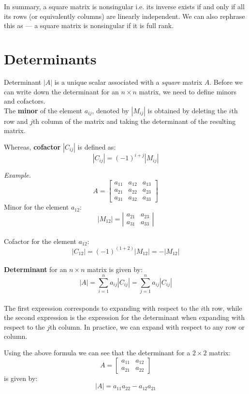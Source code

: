 \documentclass{./../Latex/handout}
\begin{document}
In summary, a square matrix is nonsingular i.e. its inverse exists if and only if all its rows (or equivalently columns) are linearly independent. We can also rephrase this as --- a square matrix is nonsingular if it is full rank. 


\section{Determinants}

Determinant $|A|$ is a unique scalar associated with a \textit{square} matrix $A$. Before we can write down the determinant for an $n \times n$ matrix, we need to define minors and cofactors. \\

The \textbf{minor} of the element $a_{ij}$, denoted by $|M_{ij}|$ is obtained by deleting the $i$th row and $j$th column of the matrix and taking the determinant of the resulting matrix. 

Whereas, \textbf{cofactor} $|C_{ij}|$ is defined as:
$$ |C_{ij}| = (-1)^{i+j} |M_{ij}| $$

\textit{Example.} $$
A=\left[\begin{array}{lll}
a_{11} & a_{12} & a_{13} \\
a_{21} & a_{22} & a_{23} \\
a_{31} & a_{32} & a_{33}
\end{array}\right]
$$
Minor for the element $a_{12}$: 
$$ \left|M_{12}\right|=\left|\begin{array}{ll}a_{21} & a_{23} \\ a_{31} & a_{33}\end{array}\right| $$ \\
Cofactor for the element $a_{12}$: 
$$ \left|C_{12}\right| = (-1)^{(1+2)}  \left|M_{12}\right| = -  \left|M_{12}\right| $$ \\

\textbf{Determinant} for an  $n \times n$ matrix is given by:
 $$|A| = \sum_{i=1}^n a_{ij} |C_{ij}| = \sum_{j=1}^n a_{ij} |C_{ij}| $$ \\
The first expression corresponds to expanding with respect to the $i$th row, while the second expression is the expression for the determinant when expanding with respect to the $j$th column. In practice, we can expand with respect to any row or column. 

Using the above formula we can see that the determinant for a $2 \times 2$ matrix:
 $$ A=\left[\begin{array}{ll}a_{11} & a_{12} \\ a_{21} & a_{22}\end{array}\right] $$
 is given by: $$ |A|=a_{11} a_{22}-a_{12} a_{21} $$                
 
\end{document}
